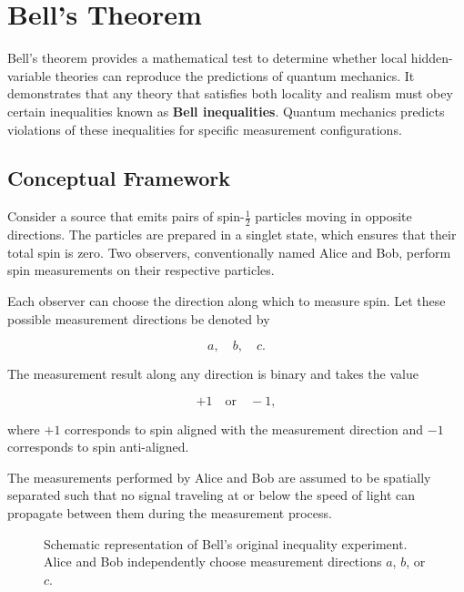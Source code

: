 \documentclass[17pt,a4paper]{extarticle}
\begin{document}
\section{Bell's Theorem}

Bell’s theorem provides a mathematical test to determine whether local hidden-variable theories can reproduce the predictions of quantum mechanics. It demonstrates that any theory that satisfies both locality and realism must obey certain inequalities known as \textbf{Bell inequalities}. Quantum mechanics predicts violations of these inequalities for specific measurement configurations.


\subsection{Conceptual Framework}

Consider a source that emits pairs of spin-$\frac{1}{2}$ particles moving in opposite directions. The particles are prepared in a singlet state, which ensures that their total spin is zero. Two observers, conventionally named Alice and Bob, perform spin measurements on their respective particles.

Each observer can choose the direction along which to measure spin. Let these possible measurement directions be denoted by

\[
a, \quad b, \quad c.
\]

The measurement result along any direction is binary and takes the value

\[
+1 \quad \text{or} \quad -1,
\]

where $+1$ corresponds to spin aligned with the measurement direction and $-1$ corresponds to spin anti-aligned.

The measurements performed by Alice and Bob are assumed to be spatially separated such that no signal traveling at or below the speed of light can propagate between them during the measurement process.
\begin{figure}[h]
\centering
{}
\caption{Schematic representation of Bell's original inequality experiment. Alice and Bob independently choose measurement directions $a$, $b$, or $c$.}
\end{figure}
\end{document}
